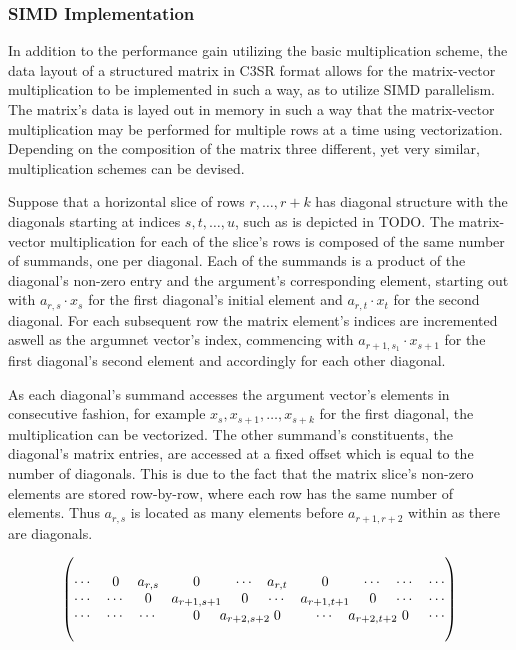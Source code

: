 \documentclass{article}
\newcommand{\tikzmark}[2]{
    \tikz[overlay,remember picture,baseline]
    \node[anchor=base] (#1) {$#2$};
}
\begin{document}
    \subsubsection{SIMD Implementation}

      In addition to the performance gain utilizing the basic multiplication scheme, the data layout of a structured matrix in C3SR format allows for the matrix-vector multiplication to be implemented in such a way, as to utilize SIMD parallelism. The matrix's data is layed out in memory in such a way that the matrix-vector multiplication may be performed for multiple rows at a time using vectorization. Depending on the composition of the matrix three different, yet very similar, multiplication schemes can be devised.

      Suppose that a horizontal slice of rows $r, \ldots, r+k$ has diagonal structure with the diagonals starting at indices $s, t, \ldots, u$, such as is depicted in TODO. The matrix-vector multiplication for each of the slice's rows is composed of the same number of summands, one per diagonal. Each of the summands is a product of the diagonal's non-zero entry and the argument's corresponding element, starting out with $a_{r,s} \cdot x_s$ for the first diagonal's initial element and $a_{r,t} \cdot x_t$ for the second diagonal. For each subsequent row the matrix element's indices are incremented aswell as the argumnet vector's index, commencing with $a_{r+1, s_1} \cdot x_{s+1}$ for the first diagonal's second element and accordingly for each other diagonal.

      As each diagonal's summand accesses the argument vector's elements in consecutive fashion, for example $x_s, x_{s+1}, \ldots, x_{s + k}$ for the first diagonal, the multiplication can be vectorized. The other summand's constituents, the diagonal's matrix entries, are accessed at a fixed offset which is equal to the number of diagonals. This is due to the fact that the matrix slice's non-zero elements are stored row-by-row, where each row has the same number of elements. Thus $a_{r,s}$ is located as many elements before $a_{r+1, r+2}$ within \V as there are diagonals. 

      \begin{equation}
        \begin{pmatrix}
          \\
          \cdots & 0 & \tikzmark{diagAFirst}{a_{r,s}} &  0 & \cdots & \tikzmark{diagBFirst}{a_{r,t}} & 0 & \cdots & \cdots & \cdots \\
          \cdots & \cdots & 0 & a_{r+1,s+1} & 0 & \cdots & a_{r+1,t+1} & 0 & \cdots & \cdots \\
          \cdots & \cdots & \cdots & 0 & \tikzmark{diagALast}{a_{r+2,s+2}} & 0 & \cdots & \tikzmark{diagBLast}{a_{r+2,t+2}} & 0 & \cdots \\
          \\
        \end{pmatrix}
      \end{equation}
\end{document}
